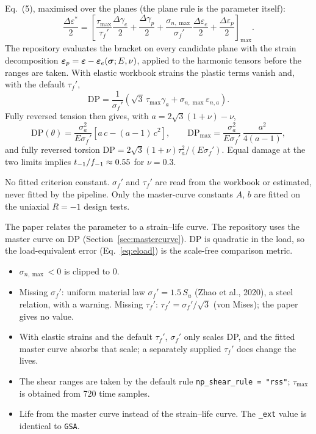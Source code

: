  Eq.~(5), maximised over the planes (the plane rule is the parameter itself):
\begin{equation}
\frac{\Delta\varepsilon^*}{2}=\left[\frac{\tau_{\max}}{\tau_f'}\frac{\Delta\gamma_e}{2}
+\frac{\Delta\gamma_p}{2}+\frac{\sigma_{n,\max}}{\sigma_f'}\frac{\Delta\varepsilon_e}{2}
+\frac{\Delta\varepsilon_p}{2}\right]_{\max} .
\label{eq:gsa-main}
\end{equation}
The repository evaluates the bracket on every candidate plane with the strain decomposition
$\boldsymbol\varepsilon_p=\boldsymbol\varepsilon-\boldsymbol\varepsilon_e(\boldsymbol\sigma;E,\nu)$, applied to the harmonic tensors before the ranges are taken.
With elastic workbook strains the plastic terms vanish and, with the default $\tau_f'$,
\begin{equation}
\mathrm{DP}=\frac{1}{\sigma_f'}\left(\sqrt3\,\tau_{\max}\gamma_a+\sigma_{n,\max}\varepsilon_{n,a}\right).
\label{eq:gsa-elastic}
\end{equation}
Fully reversed tension then gives, with $a=2\sqrt3(1+\nu)-\nu$,
\begin{equation}
\mathrm{DP}(\theta)=\frac{\sigma_a^2}{E\sigma_f'}\left[a\,c-(a-1)\,c^2\right],\qquad
\mathrm{DP}_{\max}=\frac{\sigma_a^2}{E\sigma_f'}\,\frac{a^2}{4(a-1)},
\label{eq:gsa-uni}
\end{equation}
and fully reversed torsion $\mathrm{DP}=2\sqrt3(1+\nu)\tau_a^2/(E\sigma_f')$. Equal damage at the
two limits implies $t_{-1}/f_{-1}\approx0.55$ for $\nu=0.3$.

 No fitted criterion constant. $\sigma_f'$ and $\tau_f'$ are read
from the workbook or estimated, never fitted by the pipeline. Only the master-curve constants $A$,
$b$ are fitted on the uniaxial $R=-1$ design tests.

 The paper relates the parameter to a strain--life curve. The repository uses the
master curve on DP (Section~\ref{sec:mastercurve}). DP is quadratic in the load, so the
load-equivalent error (Eq.~\eqref{eq:eload}) is the scale-free comparison metric.

\begin{itemize}
\item $\sigma_{n,\max}<0$ is clipped to 0.
\item Missing $\sigma_f'$: uniform material law $\sigma_f'=1.5\,S_u$ (Zhao et al., 2020), a steel
  relation, with a warning. Missing $\tau_f'$: $\tau_f'=\sigma_f'/\sqrt3$ (von Mises); the paper
  gives no value.
\item With elastic strains and the default $\tau_f'$, $\sigma_f'$ only scales DP, and the fitted
  master curve absorbs that scale; a separately supplied $\tau_f'$ does change the lives.
\item The shear ranges are taken by the default rule \texttt{np\_shear\_rule = "rss"};
  $\tau_{\max}$ is obtained from 720 time samples.
\item Life from the master curve instead of the strain--life curve. The \texttt{\_ext} value is
  identical to \texttt{GSA}.
\end{itemize}

